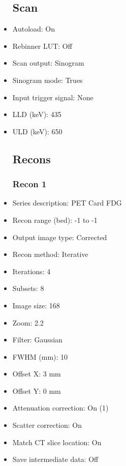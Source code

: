 \documentclass[12pt]{article}
\begin{document}
\begin{itemize}[noitemsep]
\subsection{Scan}
\item Autoload: On
\item Rebinner LUT: Off
\item Scan output: Sinogram
\item Sinogram mode: Trues
\item Input trigger signal: None
\item LLD (keV): 435
\item ULD (keV): 650
\subsection{Recons}
\subsubsection{Recon 1}
\item Series description: PET  Card FDG
\item Recon range (bed): -1 to -1
\item Output image type: Corrected
\item Recon method: Iterative
\item Iterations: 4
\item Subsets: 8
\item Image size: 168
\item Zoom: 2.2
\item Filter: Gaussian
\item FWHM (mm): 10
\item Offset X: 3 mm
\item Offset Y: 0 mm
\item Attenuation correction: On (1)
\item Scatter correction: On
\item Match CT slice location: On
\item Save intermediate data: Off
\end{itemize}
\end{document}
